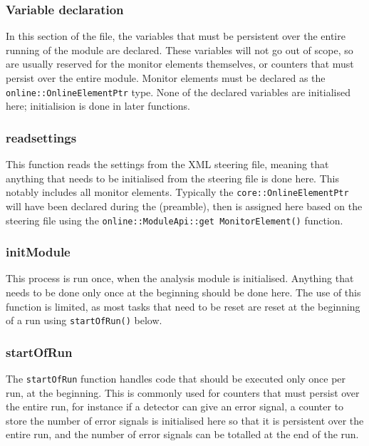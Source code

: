 \subsubsection{Variable declaration}
In this section of the file, the variables that must be persistent over the entire running of the module are declared. These variables will not go out of scope, so are usually reserved for the monitor elements themselves, or counters that must persist over the entire module. Monitor elements must be declared as the \texttt{online::OnlineElementPtr} type. None of the declared variables are initialised here; initialision is done in later functions.

\subsubsection{readsettings}
This function reads the settings from the XML steering file, meaning that anything that needs to be initialised from the steering file is done here. This notably includes all monitor elements. Typically the \texttt{core::OnlineElementPtr} will have been declared during the (preamble), then is assigned here based on the steering file using the \texttt{online::ModuleApi::get MonitorElement()} function. 

\subsubsection{initModule}
This process is run once, when the analysis module is initialised. Anything that needs to be done only once at the beginning should be done here. The use of this function is limited, as most tasks that need to be reset are reset at the beginning of a run using \texttt{startOfRun()} below.

\subsubsection{startOfRun}
The \texttt{startOfRun} function handles code that should be executed only once per run, at the beginning. This is commonly used for counters that must persist over the entire run, for instance if a detector can give an error signal, a counter to store the number of error signals is initialised here so that it is persistent over the entire run, and the number of error signals can be totalled at the end of the run.


